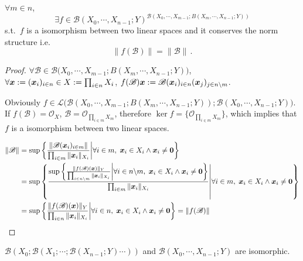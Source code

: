 \documentclass[openany]{book}
\begin{document}
\begin{theorem}
	$\forall m \in n$, 
	\begin{equation*}
		\exists f \in \mathcal B(X_0, \cdots, X_{n-1}; Y)^{\mathcal B (X_0, \cdots, X_{m-1}; B(X_m, \cdots, X_{n-1}; Y))}
	\end{equation*}
	s.t.\ $f$ is a isomorphism between two linear spaces and it conserves the norm structure i.e.\ 
	\begin{equation*}
		\|f(\mathscr B)\| = \|\mathscr B\|\,.
	\end{equation*}
\end{theorem}
\begin{proof}
	$\forall \mathscr B \in \mathcal B \big(X_0, \cdots, X_{m-1}; B(X_m, \cdots, X_{n-1}; Y)\big)$, $\forall \boldsymbol{x} := (\boldsymbol{x}_i)_{i \in n} \in X := \prod_{i \in n} X_i$, $f(\mathscr B) \boldsymbol{x} := \mathscr B(\boldsymbol{x}_i)_{i \in n} (\boldsymbol{x}_j)_{j \in n \backslash m}$.

	Obviously $f \in \mathcal L\big(\mathcal B (X_0, \cdots, X_{m-1}; B(X_m, \cdots, X_{n-1}; Y)); \mathcal B(X_0, \cdots, X_{n-1}; Y)\big)$. 
	If $f(\mathscr B) = \mathscr O_X$, $\mathscr B = \mathscr O_{\prod_{i \in m} X_m}$, therefore $\ker f = \{\mathscr O_{\prod_{i \in m} X_m}\}$, which implies that $f$ is a isomorphism between two linear spaces.

	\begin{align*}
		\|\mathscr B\| &= \sup 
		\left\{ 
			\frac{\|\mathscr B(\boldsymbol{x}_i)_{i \in m}\|}{\prod_{i \in m} \|\boldsymbol{x}_i\|_{X_i}}
		\middle|
			\forall i \in m,\; \boldsymbol{x}_i \in X_i \wedge \boldsymbol{x}_i \neq \boldsymbol{0}
		\right\}
		\\
		&= \sup 
		\left\{ 
			\frac{\sup \left\{ 
				\frac{\|f(\mathscr B)(\boldsymbol{x})\|_Y}{\prod_{i \in n \backslash m} \|\boldsymbol{x}_i\|_{X_i}}
			\middle|
				\forall i \in n \backslash m,\; \boldsymbol{x}_i \in X_i \wedge \boldsymbol{x}_i \neq \boldsymbol{0}
			\right\}}{\prod_{i \in m} \|\boldsymbol{x}_i\|_{X_i}}
		\middle|
			\forall i \in m,\; \boldsymbol{x}_i \in X_i \wedge \boldsymbol{x}_i \neq \boldsymbol{0}
		\right\}
		\\
		&=
		\sup \left\{ 
				\frac{\|f(\mathscr B)(\boldsymbol{x})\|_Y}{\prod_{i \in n} \|\boldsymbol{x}_i\|_{X_i}}
				\middle|
				\forall i \in n,\; \boldsymbol{x}_i \in X_i \wedge \boldsymbol{x}_i \neq \boldsymbol{0}
			\right\}
		= \|f(\mathscr B)\|
	\end{align*}
\end{proof}

\begin{corollary}\label{corollary: important isomorphism}
	$\mathcal B(X_0; \mathcal B(X_1; \cdots; \mathcal B(X_{n-1}; Y) \cdots ))$  and $\mathcal B(X_0, \cdots, X_{n-1}; Y)$ are isomorphic.
\end{corollary}
\end{document}
